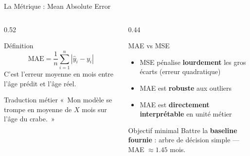 \documentclass[aspectratio=169, 10pt]{beamer}
\begin{document}
\begin{frame}{La Métrique : Mean Absolute Error}
  \begin{columns}[T]
    \begin{column}{0.52\textwidth}
      \begin{block}{Définition}
        \[
          \mathrm{MAE} = \frac{1}{n}\sum_{i=1}^{n}|\hat{y}_i - y_i|
        \]
        C'est l'erreur moyenne en mois entre l'âge prédit et
        l'âge réel.
      \end{block}
      \smallskip
      \begin{exampleblock}{Traduction métier}
        «~Mon modèle se trompe en moyenne de $X$ mois
        sur l'âge du crabe.~»
      \end{exampleblock}
    \end{column}
    \begin{column}{0.44\textwidth}
      \begin{block}{MAE vs MSE}
        \begin{itemize}
          \item MSE pénalise \textbf{lourdement} les gros écarts
                (erreur quadratique)
          \item MAE est \textbf{robuste} aux outliers
          \item MAE est \textbf{directement interprétable}
                en unité métier
        \end{itemize}
      \end{block}
      \smallskip
      \begin{alertblock}{Objectif minimal}
        Battre la \textbf{baseline fournie} : arbre de décision
        simple --- MAE $\approx 1.45$ mois.
      \end{alertblock}
    \end{column}
  \end{columns}
\end{frame}
\end{document}
